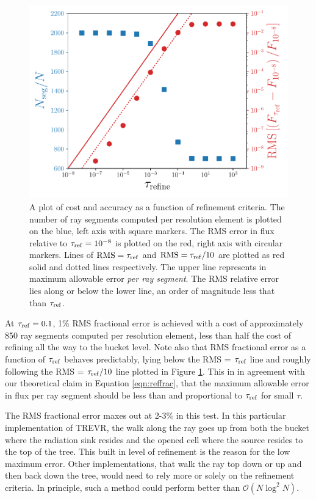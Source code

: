 \documentclass[fleq,usenatbib]{mnras}
\newcommand{\acro}{TREVR}
\newcommand{\bigO}[1]{\mathcal{O}\left(#1\right)}
\newcommand{\tr}{\tau_{\rm ref}}
\begin{document}
\begin{figure}
\includegraphics[width=1\linewidth]{Figures/refinement_criteria.pdf}
\caption{A plot of cost and accuracy as a function of refinement criteria. The 
number of ray segments computed per resolution element is plotted on the blue,
left axis with square markers. The RMS error in flux relative to $\tr
=10^{-8}$ is plotted on the red, right axis with circular markers. Lines of 
${\rm RMS} = \tr$ and ${\rm RMS} = \tr/10$ are plotted as red solid and dotted 
lines respectively. The upper line represents in maximum allowable error 
\textit{per ray segment}. The RMS relative error lies along or below the lower 
line, an order of magnitude less that than $\tr$.}
\label{fig:refcrit}
\end{figure}

At $\tr=0.1$, 1\% RMS fractional error is achieved with a cost of 
approximately 850 ray segments computed per resolution element, less than half 
the cost of refining all the way to the bucket level. Note also that RMS 
fractional error as a function of $\tr$ behaves predictably, lying below the 
RMS = $\tr$ line and roughly following the RMS = $\tr/10$ line plotted in 
Figure \ref{fig:refcrit}. This in in agreement with our theoretical claim in 
Equation \ref{eqn:reffrac}, that the maximum allowable error in flux per ray 
segment should be less than and proportional to $\tr$ for small $\tau$. 

The RMS fractional error maxes out at 2-3\% in this test. In this particular 
implementation of \acro{}, the walk along the ray goes up from both the bucket 
where the radiation sink resides and the opened cell where the source resides 
to the top of the tree. This built in level of refinement is the reason for 
the low maximum error. Other implementations, that walk the ray top down or up 
and then back down the tree, would need to rely more or solely on the 
refinement criteria. In principle, such a method could perform better than 
$\bigO{N\log^2 N}$.
\end{document}
